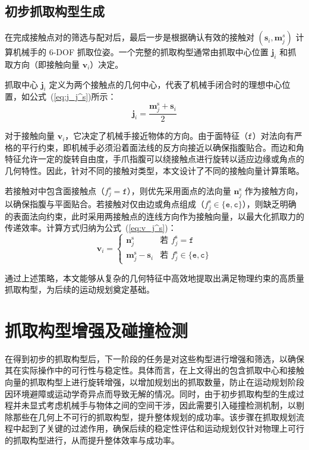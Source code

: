 \subsection{初步抓取构型生成}

在完成接触点对的筛选与配对后，最后一步是根据确认有效的接触对 $(\mathbf{s}_i, \mathbf{m}_j^s)$ 计算机械手的 6-DOF 抓取位姿。一个完整的抓取构型通常由抓取中心位置 $\mathbf{j}_i$ 和抓取方向（即接触向量 $\mathbf{v}_i$）决定。

抓取中心 $\mathbf{j}_i$ 定义为两个接触点的几何中心，代表了机械手闭合时的理想中心位置，如公式~(\ref{eq:j_j^s})所示：
\begin{equation}
    \mathbf{j}_i = \frac{\mathbf{m}_j^\text{s} + \mathbf{s}_i}{2}
    \label{eq:j_j^s}
\end{equation}

对于接触向量 $\mathbf{v}_i$，它决定了机械手接近物体的方向。由于面特征（$\mathtt{f}$）对法向有严格的平行约束，即机械手必须沿着面法线的反方向接近以确保指腹贴合。而边和角特征允许一定的旋转自由度，手爪指腹可以绕接触点进行旋转以适应边缘或角点的几何特性。因此，针对不同的接触对类型，本文设计了不同的接触向量计算策略。

若接触对中包含面接触点（$f_j^\text{s} = \mathtt{f}$），则优先采用面点的法向量 $\mathbf{n}_j^\text{s}$ 作为接触方向，以确保指腹与平面贴合。若接触对仅由边或角点组成（$f_j^\text{s} \in \{\mathtt{e}, \mathtt{c}\}$），则缺乏明确的表面法向约束，此时采用两接触点的连线方向作为接触向量，以最大化抓取力的传递效率。计算方式归纳为公式~(\ref{eq:v_j^s})：
\begin{equation}
    \mathbf{v}_i = \begin{cases}
        \mathbf{n}_j^\text{s} & \text{若 } f_j^\text{s} = \mathtt{f} \\
        \mathbf{m}_j^\text{s} - \mathbf{s}_i & \text{若 } f_j^\text{s} \in \{\mathtt{e}, \mathtt{c}\}
    \end{cases}
    \label{eq:v_j^s}
\end{equation}

通过上述策略，本文能够从复杂的几何特征中高效地提取出满足物理约束的高质量抓取构型，为后续的运动规划奠定基础。

\section{抓取构型增强及碰撞检测}
在得到初步的抓取构型后，下一阶段的任务是对这些构型进行增强和筛选，以确保其在实际操作中的可行性与稳定性。具体而言，在上文得出的包含抓取中心和接触向量的抓取构型上进行旋转增强，以增加规划出的抓取数量，防止在运动规划阶段因环境避障或运动学奇异点而导致无解的情况。同时，由于初步抓取构型的生成过程并未显式考虑机械手与物体之间的空间干涉，因此需要引入碰撞检测机制，以剔除那些在几何上不可行的抓取构型，提升整体规划的成功率。该步骤在抓取规划流程中起到了关键的过滤作用，确保后续的稳定性评估和运动规划仅针对物理上可行的抓取构型进行，从而提升整体效率与成功率。

